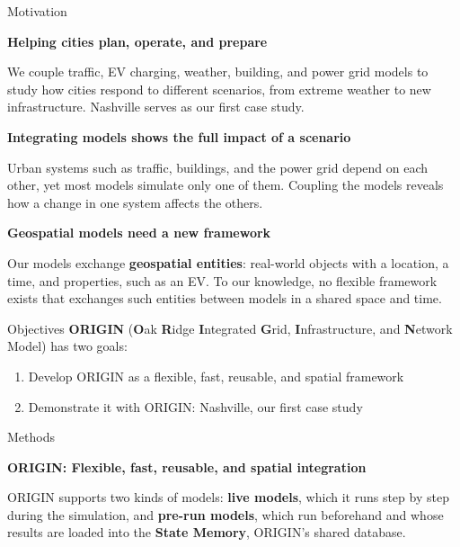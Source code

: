 \documentclass{article}
\newlength{\posgap}\setlength{\posgap}{0.8in}
\newcommand{\boxgap}{\par\vspace{\posgap}}
\newcommand{\subheadtext}[1]{%
  {\fontsize{40}{48}\selectfont\bfseries\color{utsmokey}#1\par}%
  \vspace{-10pt}{\color{utorange}\rule{\linewidth}{3pt}}\par\vspace{6pt}}
\newcommand{\subhead}[1]{\par\addvspace{32pt}\subheadtext{#1}}
\newcommand{\topsubhead}[1]{\par\vspace*{12pt}\subheadtext{#1}}
\newlength{\figgap}\setlength{\figgap}{18pt}
\begin{document}
\newlength{\colwidth}\setlength{\colwidth}{\dimexpr(\linewidth-2\posgap)/3\relax}
\begin{minipage}[t]{\colwidth}\vspace{0pt}
\begin{posterbox}{Motivation}
\RaggedRight
\topsubhead{Helping cities plan, operate, and prepare}

\vspace{10pt}
{\centering\par
 \par}
\vspace{\figgap}

We couple traffic, EV charging, weather, building, and power grid models to
study how cities respond to different scenarios, from extreme weather to new
infrastructure. Nashville serves as our first case study.

\subhead{Integrating models shows the full impact of a scenario}
Urban systems such as traffic, buildings, and the power grid depend on each
other, yet most models simulate only one of them. Coupling the models reveals
how a change in one system affects the others.

\subhead{Geospatial models need a new framework}
Our models exchange \textbf{geospatial entities}: real-world objects with a
location, a time, and properties, such as an EV. To our knowledge, no flexible
framework exists that exchanges such entities between models in a shared space
and time.
\end{posterbox}
\boxgap
\begin{posterbox}{Objectives}
\RaggedRight
\textbf{ORIGIN} (\textbf{O}ak \textbf{R}idge \textbf{I}ntegrated \textbf{G}rid,
\textbf{I}nfrastructure, and \textbf{N}etwork Model) has two goals:
\begin{enumerate}
  \item Develop ORIGIN as a flexible, fast, reusable, and spatial framework
  \item Demonstrate it with ORIGIN: Nashville, our first case study
\end{enumerate}
\end{posterbox}
\boxgap
\begin{posterbox}{Methods}
\RaggedRight
\topsubhead{ORIGIN: Flexible, fast, reusable, and spatial integration}
ORIGIN supports two kinds of models: \textbf{live models}, which it runs step
by step during the simulation, and \textbf{pre-run models}, which run
beforehand and whose results are loaded into the \textbf{State Memory},
ORIGIN's shared database.
\end{posterbox}
\end{minipage}%
\end{document}
